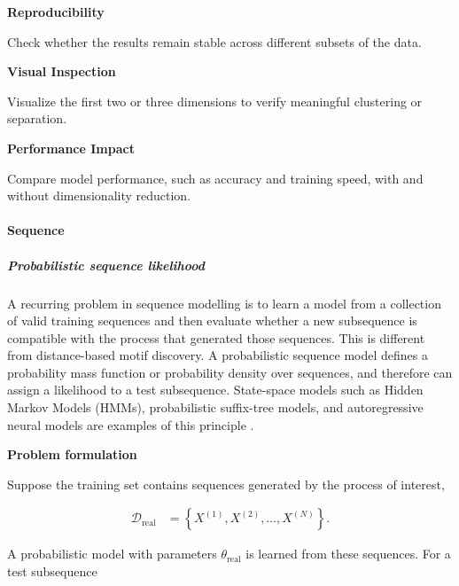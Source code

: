 \documentclass{book}
\providecommand{\ProjectDeepHeading}[2]{%
    \par\medskip\noindent\textbf{#2}\par\smallskip
}
\begin{document}
    \ProjectDeepHeading{5}{Reproducibility}
        Check whether the results remain stable across different subsets of the data.
    
    \ProjectDeepHeading{5}{Visual Inspection}
        Visualize the first two or three dimensions to verify meaningful clustering or separation.
    
    \ProjectDeepHeading{5}{Performance Impact}
        Compare model performance, such as accuracy and training speed, with and without dimensionality reduction.

\paragraph{Sequence}

\subparagraph{Probabilistic sequence likelihood}


A recurring problem in sequence modelling is to learn a model from a collection of valid training sequences and then evaluate whether a new subsequence is compatible with the process that generated those sequences. This is different from distance-based motif discovery. A probabilistic sequence model defines a probability mass function or probability density over sequences, and therefore can assign a likelihood to a test subsequence. State-space models such as Hidden Markov Models (HMMs), probabilistic suffix-tree models, and autoregressive neural models are examples of this principle \cite{murphy-2002-dynamic-bayesian-networks-representation-inference-and-learning,pimentel-clifton-clifton-tarassenko-2014-a-review-of-novelty-detection,bengio-2003-a-neural-probabilistic-language-model}.

    \ProjectDeepHeading{3}{Problem formulation}

        Suppose the training set contains sequences generated by the process of interest,

        \begin{align}
            \mathcal{D}_{\mathrm{real}}
            &=
            \left\{
            X^{(1)},X^{(2)},\dots,X^{(N)}
            \right\}.
        \end{align}

        \noindent
        A probabilistic model with parameters \(\ensuremath{\theta}_{\mathrm{real}}\) is learned from these sequences. For a test subsequence
\end{document}
